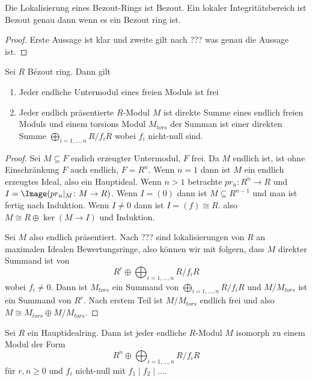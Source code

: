 \begin{Satz}
	Die Lokalisierung eines Bezout-Rings ist Bezout. Ein lokaler Integritätsbereich ist Bezout genau dann wenn es ein Bezout ring ist.
\end{Satz}
\begin{proof}
	Erste Aussage ist klar und zweite gilt nach ??? was genau die Aussage ist.
\end{proof}
\begin{Lemma}\label{Lem:StruktBezoutring}
	Sei \(R\) Bézout ring. Dann gilt 
	\begin{enumerate}
		\item Jeder endliche Untermodul eines freien Moduls ist frei
		\item Jeder endlich präsentierte \(R\)-Modul \(M\) ist direkte Summe eines endlich freien Moduls und einem torsions Modul \(M_{tors}\) der Summan ist einer direkten Summe \(\bigoplus_{i=1,\dots,n}R/f_iR\) wobei \(f_i\) nicht-null sind.
	\end{enumerate}
\end{Lemma}
\begin{proof}
	Sei \(M\subseteq F\) endich erzeugter Untermodul, \(F\) frei. Da \(M\) endlich ist, ist ohne Einschränkung \(F\) auch endlich, \(F=R^n\). Wenn \(n=1\) dann ist \(M\) ein endlich erzeugtes Ideal, also ein Hauptideal. Wenn \(n>1\) betrachte \(pr_n\colon R^n\to R\) und \(I=\Image(pr_n|_M\colon M\to R)\). Wenn \(I=(0)\) dann ist \(M\subseteq R^{n-1}\) und man ist fertig nach Induktion. Wenn \(I\neq 0\) dann ist \(I=(f)\cong R\). also \(M\cong R\oplus \ker(M\to I)\) und Induktion.
	
	Sei \(M\) also endlich präsentiert. Nach ??? sind lokalisierungen von \(R\) an maximalen Idealen Bewertungsringe, also können wir mit  folgern, dass \(M\) direkter Summand ist von \[R^r\oplus\bigoplus_{i=1,\dots,n}R/f_iR\] wobei \(f_i\neq 0\). Dann ist \(M_{tors}\) ein Summand von \(\bigoplus_{i=1,\dots,n}R/f_iR\) und \(M/M_{tors}\) ist ein Summand von \(R^r\). Nach erstem Teil ist \(M/M_{tors}\) endlich frei und also \(M\cong M_{tors}\oplus M/M_{tors}\).
\end{proof}
\begin{Satz}\label{Satz:StruktEndlModPID}
	Sei \(R\) ein Hauptidealring. Dann ist jeder endliche \(R\)-Modul \(M\) isomorph zu einem Modul der Form \[R^n\oplus\bigoplus_{i=1,\dots,n}R/f_iR\] für \(r,n\geq 0\) und \(f_i\) nicht-null mit \(f_1\mid f_2\mid\dots\).
	
\end{Satz}
